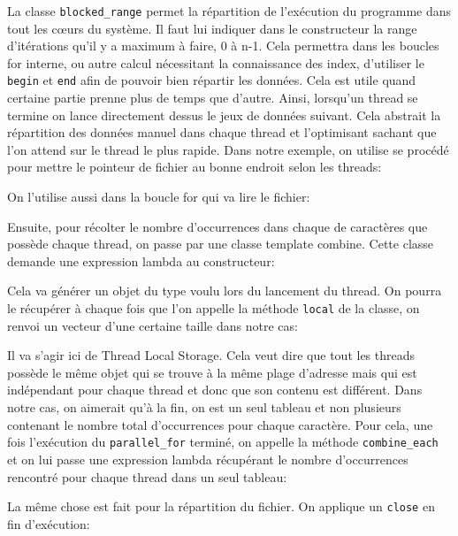 \documentclass[10pt,a4paper]{article}
\begin{document}
La classe \texttt{blocked\_range} permet la répartition de l'exécution du programme dans tout les cœurs du système. Il faut lui indiquer dans le constructeur la range d'itérations qu'il y a maximum à faire, 0 à n-1. Cela permettra dans les boucles for interne, ou autre calcul nécessitant la connaissance des index, d'utiliser le \texttt{begin} et \texttt{end} afin de pouvoir bien répartir les données. Cela est utile quand certaine partie prenne plus de temps que d'autre. Ainsi, lorsqu'un thread se termine on lance directement dessus le jeux de données suivant.
Cela abstrait la répartition des données manuel dans chaque thread et l'optimisant sachant que l'on attend sur le thread le plus rapide. Dans notre exemple, on utilise se procédé pour mettre le pointeur de fichier au bonne endroit selon les threads:

On l'utilise aussi dans la boucle for qui va lire le fichier:


Ensuite, pour récolter le nombre d'occurrences dans chaque de caractères que possède chaque thread, on passe par une classe template combine. Cette classe demande une expression lambda au constructeur:

Cela va générer un objet du type voulu lors du lancement du thread. On pourra le récupérer à chaque fois que l'on appelle la méthode \texttt{local} de la classe, on renvoi un vecteur d'une certaine taille dans notre cas:

Il va s'agir ici de Thread Local Storage. Cela veut dire que tout les threads possède le même objet qui se trouve à la même plage d'adresse mais qui est indépendant pour chaque thread et donc que son contenu est différent. Dans notre cas, on aimerait qu'à la fin, on est un seul tableau et non plusieurs contenant le nombre total d’occurrences pour chaque caractère. Pour cela, une fois l'exécution du \texttt{parallel\_for} terminé, on appelle la méthode \texttt{combine\_each} et on lui passe  une expression lambda récupérant le nombre d'occurrences rencontré pour chaque thread dans un seul tableau:

La même chose est fait pour la répartition du fichier. On applique un \texttt{close} en fin d'exécution:


\newpage
\end{document}
